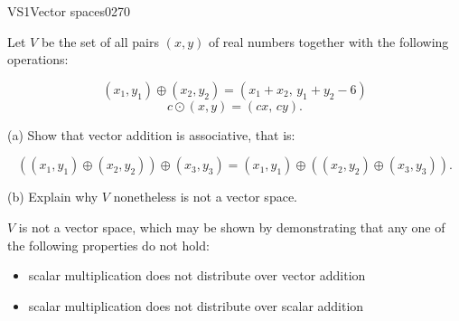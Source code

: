 \begin{exercise}{VS1}{Vector spaces}{0270} 
\begin{exerciseStatement} 

 Let \(V\) be the set of all pairs \((x,y)\) of real numbers together with the following operations: 

 \[(x_1,y_1)\oplus (x_2,y_2)=\left(x_{1} + x_{2},\,y_{1} + y_{2} - 6\right)\]\[c \odot (x,y) =\left(c x,\,c y\right).\] 

 (a) Show that vector addition is associative, that is: 

 \[
      \left((x_1,y_1)\oplus(x_2,y_2)\right)\oplus(x_3,y_3)=(x_1,y_1)\oplus\left((x_2,y_2)\oplus(x_3,y_3)\right).
    \] 

 (b) Explain why \(V\) nonetheless is not a vector space. 

 \end{exerciseStatement}
 \begin{exerciseAnswer} 

 \(V\) is not a vector space, which may be shown by demonstrating that any one of the following properties do not hold: 

 

\begin{itemize}
\item scalar multiplication does not distribute over vector addition
\item scalar multiplication does not distribute over scalar addition
\end{itemize}

     \end{exerciseAnswer}
 \end{exercise}



